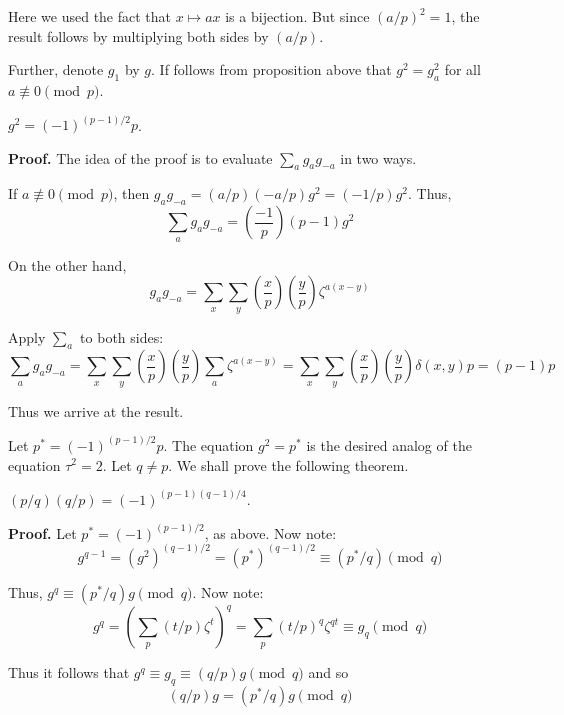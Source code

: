 \documentclass{template}
\begin{document}
Here we used the fact that $x \mapsto ax$ is a bijection. But since $(a/p)^2=1$,
the result follows by multiplying both sides by $(a/p)$.

Further, denote $g_1$ by $g$. If follows from proposition above that 
$g^2=g_a^2$ for all $a \not\equiv 0 \pmod{p}$. 

\begin{proposition}
    $g^2 = (-1)^{(p-1)/2}p$.
\end{proposition}

\textbf{Proof.} The idea of the proof is to evaluate $\sum_a g_ag_{-a}$ in two ways.

If $a \not\equiv 0 \pmod{p}$, then $g_ag_{-a} = (a/p)(-a/p)g^2 = (-1/p)g^2$. Thus,
\begin{equation*}
    \sum_{a}g_ag_{-a} = \left(\frac{-1}{p}\right)(p-1)g^2
\end{equation*}

On the other hand,
\begin{equation*}
    g_ag_{-a} = \sum_x \sum_y \left(\frac{x}{p}\right)\left(\frac{y}{p}\right)\zeta^{a(x-y)}
\end{equation*}

Apply $\sum_a$ to both sides:
\begin{equation*}
    \sum_a g_ag_{-a} = \sum_x \sum_y \left(\frac{x}{p}\right)\left(\frac{y}{p}\right)\sum_a \zeta^{a(x-y)} = \sum_x \sum_y \left(\frac{x}{p}\right)\left(\frac{y}{p}\right) \delta(x,y)p = (p-1)p
\end{equation*}

Thus we arrive at the result.

Let $p^* = (-1)^{(p-1)/2}p$. The equation $g^2=p^*$ is the desired analog of the
equation $\tau^2=2$. Let $q\neq p$. We shall prove the following theorem.
\begin{theorem}
    $(p/q)(q/p) = (-1)^{(p-1)(q-1)/4}$.
\end{theorem}

\textbf{Proof.} Let $p^*=(-1)^{(p-1)/2}$, as above. Now note:
\begin{equation*}
    g^{q-1} = (g^2)^{(q-1)/2} = (p^*)^{(q-1)/2} \equiv (p^*/q) \pmod{q}
\end{equation*}

Thus, $g^q \equiv (p^*/q)g \pmod{q}$. Now note:
\begin{equation*}
    g^q = \left(\sum_p (t/p)\zeta^t\right)^q = \sum_p (t/p)^q \zeta^{qt} \equiv g_q \pmod{q}
\end{equation*}

Thus it follows that $g^q \equiv g_q \equiv (q/p)g \pmod{q}$ and so
\begin{equation*}
    (q/p)g = (p^*/q)g \pmod{q}
\end{equation*}
\end{document}
